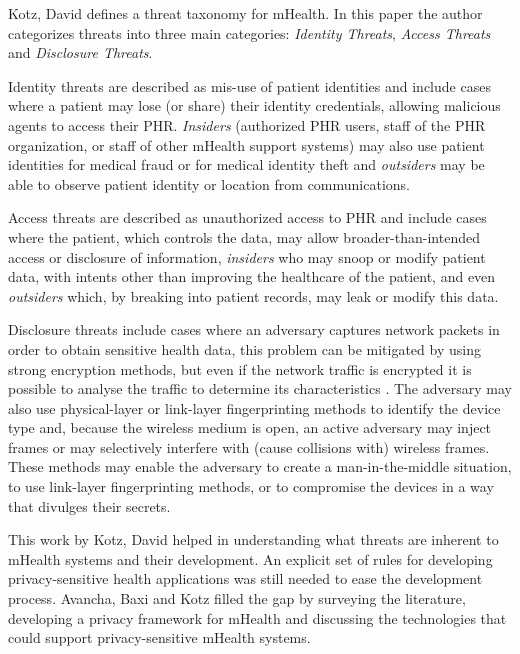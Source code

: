 
Kotz, David \cite{kotz2011threat} defines a threat taxonomy for mHealth. In this paper the author categorizes threats into three main categories: \emph{Identity Threats}, \emph{Access Threats} and \emph{Disclosure Threats}.

Identity threats are described as mis-use of patient identities and include cases where a patient may lose (or share) their identity credentials, allowing malicious agents to access their \ac{PHR}. \emph{Insiders} (authorized \ac{PHR} users, staff of the \ac{PHR} organization, or staff of other mHealth support systems) may also use patient identities for medical fraud or for medical identity theft and \emph{outsiders} may be able to observe patient identity or location from communications.

Access threats are described as unauthorized access to \ac{PHR} and include cases where the patient, which controls the data, may allow broader-than-intended access or disclosure of information, \emph{insiders} who may snoop or modify patient data, with intents other than improving the healthcare of the patient, and even \emph{outsiders} which, by breaking into patient records, may leak or modify this data.

Disclosure threats include cases where an adversary captures network packets in order to obtain sensitive health data, this problem can be mitigated by using strong encryption methods, but even if the network traffic is encrypted it is possible to analyse the traffic to determine its characteristics \cite{wright2006inferring}. The adversary may also use physical-layer or link-layer fingerprinting methods to identify the device type and, because the wireless medium is open, an active adversary may inject frames or may selectively interfere with (cause collisions with) wireless frames. These methods may enable the adversary to create a man-in-the-middle situation, to use link-layer fingerprinting methods, or to compromise the devices in a way that divulges their secrets.

This work by Kotz, David \cite{kotz2011threat} helped in understanding what threats are inherent to mHealth systems and their development. An explicit set of rules for developing privacy-sensitive health applications was still needed to ease the development process. Avancha, Baxi and Kotz \cite{avancha2012privacy} filled the gap by surveying the literature, developing a privacy framework for mHealth and discussing the technologies that could support privacy-sensitive mHealth systems.


